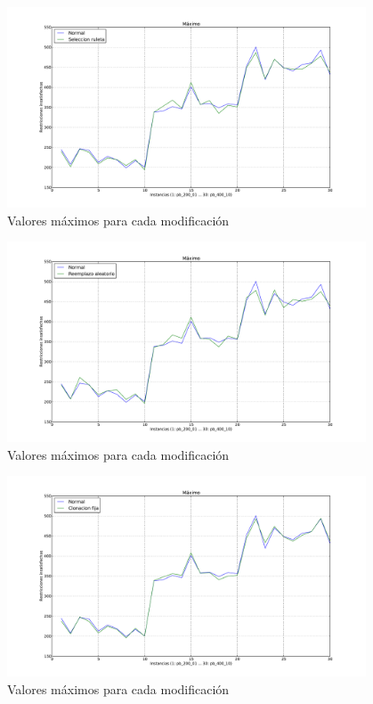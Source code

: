 \begin{figure}[h!]
\begin{center}
\includegraphics[width=0.95\textwidth]{img/max-2.pdf}
\end{center}
\caption{Valores máximos para cada modificación}
\label{fig:max-2}
\end{figure}

\begin{figure}[h!]
\begin{center}
\includegraphics[width=0.95\textwidth]{img/max-3.pdf}
\end{center}
\caption{Valores máximos para cada modificación}
\label{fig:max-3}
\end{figure}

\begin{figure}[h!]
\begin{center}
\includegraphics[width=0.95\textwidth]{img/max-4.pdf}
\end{center}
\caption{Valores máximos para cada modificación}
\label{fig:max-4}
\end{figure}


